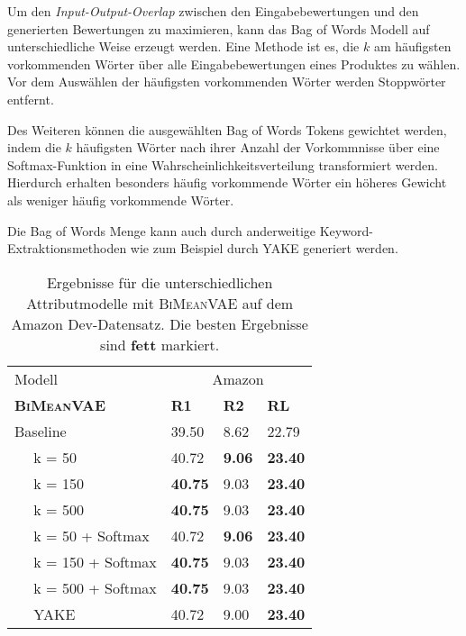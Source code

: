 Um den \textit{Input-Output-Overlap} zwischen den Eingabebewertungen und den generierten Bewertungen zu maximieren, kann das Bag of Words Modell auf unterschiedliche Weise erzeugt werden. 
Eine Methode ist es, die $k$ am häufigsten vorkommenden Wörter über alle Eingabebewertungen eines Produktes zu wählen.
Vor dem Auswählen der häufigsten vorkommenden Wörter werden Stoppwörter entfernt.

Des Weiteren können die ausgewählten Bag of Words Tokens gewichtet werden, indem die $k$ häufigsten Wörter nach ihrer Anzahl der Vorkommnisse über eine Softmax-Funktion in eine Wahrscheinlichkeitsverteilung transformiert werden.
Hierdurch erhalten besonders häufig vorkommende Wörter ein höheres Gewicht als weniger häufig vorkommende Wörter.

Die Bag of Words Menge kann auch durch anderweitige Keyword-Extraktionsmethoden wie zum Beispiel durch YAKE \citep{CAMPOS2020257} generiert werden.


\begin{table}[h!]
    \centering
    \begin{tabular}{@{}llll@{}}
    \toprule
                    Modell   & \multicolumn{3}{c}{Amazon}              \\ 
    \textbf{\textsc{BiMeanVAE} }    & \textbf{R1} & \textbf{R2} & \textbf{RL} \\ \midrule
    Baseline        & 39.50       & 8.62    &  22.79     \\
    $\quad$ k = 50       &  40.72    &   \textbf{9.06}    &   \textbf{23.40}   \\
    $\quad$ k = 150  &  \textbf{40.75}   &    9.03  &  \textbf{23.40}   \\
    $\quad$ k = 500 &  \textbf{40.75}   &    9.03  &  \textbf{23.40}   \\
    $\quad$ k = 50 + Softmax    &  40.72    &   \textbf{9.06}    &    \textbf{23.40}   \\
    $\quad$ k = 150 + Softmax  &  \textbf{40.75}   &    9.03  &  \textbf{23.40}   \\
    $\quad$ k = 500 + Softmax   &  \textbf{40.75}   &    9.03  &  \textbf{23.40}   \\
    $\quad$ YAKE &  40.72   &     9.00  &  \textbf{23.40}   \\ \bottomrule
    \end{tabular}
    \caption{Ergebnisse für die unterschiedlichen Attributmodelle mit \textsc{BiMeanVAE} auf dem Amazon Dev-Datensatz. Die besten Ergebnisse sind \textbf{fett} markiert.}
    \label{bow_opti}
\end{table}


